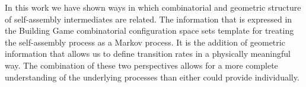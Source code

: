 













In this work we have shown ways in which combinatorial and geometric structure of self-assembly intermediates are related. The information that is expressed in the Building Game combinatorial configuration space sets template for treating the self-assembly process as a Markov process. It is the addition of geometric information that allows us to define transition rates in a physically meaningful way. The combination of these two perspectives allows for a more complete understanding of the underlying processes than either could provide individually. 







